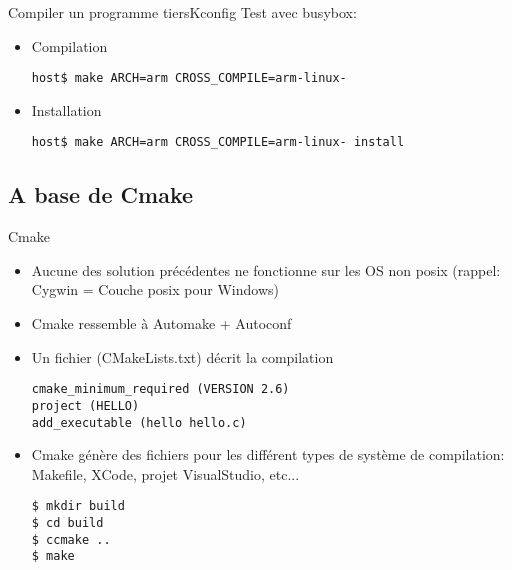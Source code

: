 \begin{frame}[fragile=singleslide]{Compiler un programme tiers}{Kconfig}
  Test avec busybox:
  \begin{itemize}
  \item Compilation
\begin{lstlisting}
host$ make ARCH=arm CROSS_COMPILE=arm-linux-
\end{lstlisting} %
  \item Installation
\begin{lstlisting}
host$ make ARCH=arm CROSS_COMPILE=arm-linux- install
\end{lstlisting} %
  \end{itemize}
\end{frame}

\subsection{A base de Cmake}

\begin{frame}[fragile=singleslide]{Cmake}
  \begin{itemize}
  \item Aucune des  solution précédentes ne fonctionne sur  les OS non
    posix (rappel: Cygwin = Couche posix pour Windows)
  \item Cmake ressemble à Automake + Autoconf
  \item Un fichier (CMakeLists.txt) décrit la compilation
    \begin{lstlisting}
cmake_minimum_required (VERSION 2.6)
project (HELLO)
add_executable (hello hello.c)
    \end{lstlisting}
  \item Cmake génère des fichiers  pour les différent types de système
    de compilation: Makefile, XCode, projet VisualStudio, etc...
    \begin{lstlisting}
$ mkdir build
$ cd build
$ ccmake ..
$ make
    \end{lstlisting}
\end{itemize}
\end{frame}

